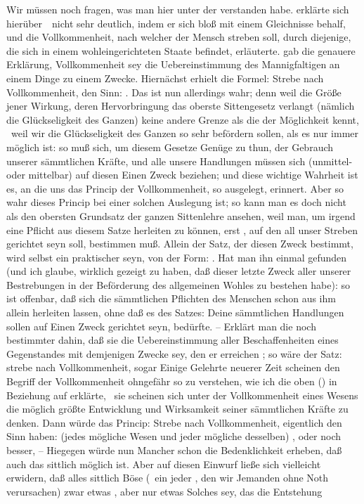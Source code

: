 Wir müssen noch fragen, was man hier unter der  verstanden habe.  erklärte sich hierüber~\ nicht sehr deutlich, indem er sich bloß mit einem Gleichnisse behalf, und die Vollkommenheit, nach welcher der Mensch streben soll, durch diejenige, die sich in einem wohleingerichteten Staate befindet, erläuterte.  gab die genauere Erklärung, Vollkommenheit sey die Uebereinstimmung des Mannigfaltigen an einem Dinge zu einem Zwecke. Hiernächst erhielt die Formel: Strebe nach Vollkommenheit, den Sinn: . Das ist nun allerdings wahr; denn weil die Größe jener Wirkung, deren Hervorbringung das oberste Sittengesetz verlangt (nämlich die Glückseligkeit des Ganzen) keine andere Grenze als die der Möglichkeit kennt, \dh\ weil wir die Glückseligkeit des Ganzen so sehr befördern sollen, als es nur immer möglich ist: so muß sich, um diesem Gesetze Genüge zu thun, der Gebrauch unserer sämmtlichen Kräfte, und alle unsere Handlungen müssen sich (unmittel- oder mittelbar) auf diesen Einen Zweck beziehen; und diese wichtige Wahrheit ist es, an die uns das Princip der Vollkommenheit, so ausgelegt, erinnert. Aber so wahr dieses Princip bei einer solchen Auslegung ist; so kann man es doch nicht als den obersten Grundsatz der ganzen Sittenlehre ansehen, weil man, um irgend eine Pflicht aus diesem Satze herleiten zu können, erst , auf den all unser Streben gerichtet seyn soll, bestimmen muß. Allein der Satz, der diesen Zweck bestimmt, wird selbst ein praktischer seyn, von der Form: . Hat man ihn einmal gefunden (und ich glaube, wirklich gezeigt zu haben, daß dieser letzte Zweck aller unserer Bestrebungen in der Beförderung des allgemeinen Wohles zu bestehen habe): so ist offenbar, daß sich die sämmtlichen Pflichten des Menschen schon aus ihm allein herleiten lassen, ohne daß es des Satzes: Deine sämmtlichen Handlungen sollen auf Einen Zweck gerichtet seyn, bedürfte. -- Erklärt man die  noch bestimmter dahin, daß sie die Uebereinstimmung aller Beschaffenheiten eines Gegenstandes mit demjenigen Zwecke sey, den er erreichen ; so wäre der Satz: strebe nach Vollkommenheit, sogar  Einige Gelehrte neuerer Zeit scheinen den Begriff der Vollkommenheit ohngefähr so zu verstehen, wie ich die  oben () in Beziehung auf  erklärte, \dh\ sie scheinen sich unter der Vollkommenheit eines Wesens die möglich größte Entwicklung und Wirksamkeit seiner sämmtlichen Kräfte zu denken. Dann würde das Princip: Strebe nach Vollkommenheit, eigentlich den Sinn haben:  (jedes mögliche Wesen und jeder mögliche  desselben) , oder noch besser,  -- Hiegegen würde nun Mancher schon die Bedenklichkeit erheben, daß auch das sittlich  möglich ist. Aber auf diesen Einwurf ließe sich vielleicht erwidern, daß alles sittlich Böse (\zB\ ein jeder , den wir Jemanden ohne Noth verursachen) zwar etwas , aber nur etwas Solches sey, das die Entstehung 